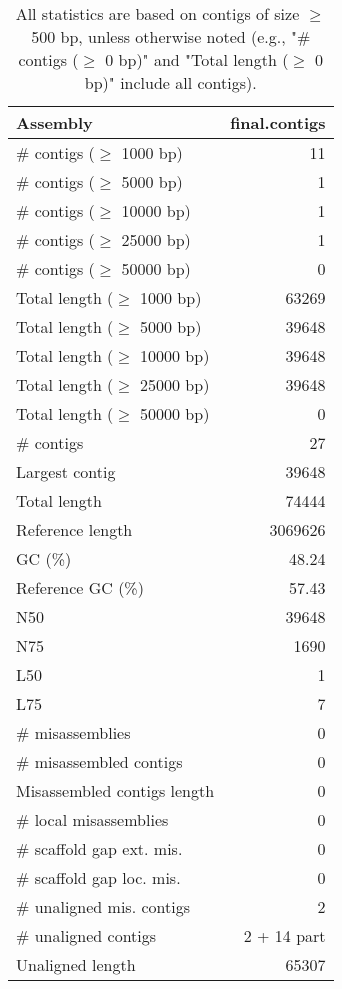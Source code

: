 \documentclass[12pt,a4paper]{article}
\begin{document}
\begin{table}[ht]
\begin{center}
\caption{All statistics are based on contigs of size $\geq$ 500 bp, unless otherwise noted (e.g., "\# contigs ($\geq$ 0 bp)" and "Total length ($\geq$ 0 bp)" include all contigs).}
\begin{tabular}{|l*{1}{|r}|}
\hline
Assembly & final.contigs \\ \hline
\# contigs ($\geq$ 1000 bp) & 11 \\ \hline
\# contigs ($\geq$ 5000 bp) & 1 \\ \hline
\# contigs ($\geq$ 10000 bp) & 1 \\ \hline
\# contigs ($\geq$ 25000 bp) & 1 \\ \hline
\# contigs ($\geq$ 50000 bp) & 0 \\ \hline
Total length ($\geq$ 1000 bp) & 63269 \\ \hline
Total length ($\geq$ 5000 bp) & 39648 \\ \hline
Total length ($\geq$ 10000 bp) & 39648 \\ \hline
Total length ($\geq$ 25000 bp) & 39648 \\ \hline
Total length ($\geq$ 50000 bp) & 0 \\ \hline
\# contigs & 27 \\ \hline
Largest contig & 39648 \\ \hline
Total length & 74444 \\ \hline
Reference length & 3069626 \\ \hline
GC (\%) & 48.24 \\ \hline
Reference GC (\%) & 57.43 \\ \hline
N50 & 39648 \\ \hline
N75 & 1690 \\ \hline
L50 & 1 \\ \hline
L75 & 7 \\ \hline
\# misassemblies & 0 \\ \hline
\# misassembled contigs & 0 \\ \hline
Misassembled contigs length & 0 \\ \hline
\# local misassemblies & 0 \\ \hline
\# scaffold gap ext. mis. & 0 \\ \hline
\# scaffold gap loc. mis. & 0 \\ \hline
\# unaligned mis. contigs & 2 \\ \hline
\# unaligned contigs & 2 + 14 part \\ \hline
Unaligned length & 65307 \\ \hline

\end{tabular}
\end{center}
\end{table}
\end{document}

